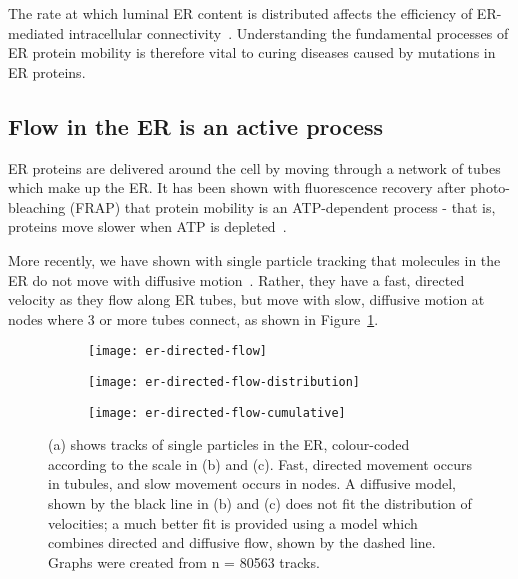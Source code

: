 The rate at which luminal ER content is distributed affects the efficiency of ER-mediated intracellular connectivity~\cite{hubner2014membrane, blackstone2011hereditary}. 
Understanding the fundamental processes of ER protein mobility is therefore vital to curing diseases caused by mutations in ER proteins.

\subsection{Flow in the ER is an active process}
ER proteins are delivered around the cell by moving through a network of tubes which make up the ER. 
It has been shown with fluorescence recovery after photo-bleaching (FRAP) that protein mobility is an ATP-dependent process - that is, proteins move slower when ATP is depleted~\cite{dayel1999diffusion, nehls2000dynamics}.

More recently, we have shown with single particle tracking that molecules in the ER do not move with diffusive motion~\cite{holcman2018single}. 
Rather, they have a fast, directed velocity as they flow along ER tubes, but move with slow, diffusive motion at nodes where 3 or more tubes connect, as shown in Figure~\ref{fig:er-directed-flow-velocity}. 

\begin{figure}[htbp!]
\centering
	\begin{subfigure}[b]{0.4\textwidth}
		\texttt{[image: er-directed-flow]}
		\caption{} \label{fig:er-directed-flow-velocity}
	\end{subfigure}	
	\hfill
	\begin{subfigure}[b]{0.29\textwidth}
		\texttt{[image: er-directed-flow-distribution]}
		\caption{} \label{fig:er-directed-flow-distribution}
	\end{subfigure}
	\hfill
	\begin{subfigure}[b]{0.29\textwidth}
		\texttt{[image: er-directed-flow-cumulative]}
		\caption{} \label{fig:er-directed-flow-cumulative}
	\end{subfigure}	
\caption[ER: Single particle tracking reveals directed flow in ER tubules]{(a) shows tracks of single particles in the ER, colour-coded according to the scale in (b) and (c). Fast, directed movement occurs in tubules, and slow movement occurs in nodes. A diffusive model, shown by the black line in (b) and (c) does not fit the distribution of velocities; a much better fit is provided using a model which combines directed and diffusive flow, shown by the dashed line. Graphs were created from n = \num{80563} tracks. } 
\label{fig:ER-directed-flow-velocity}
\end{figure}

